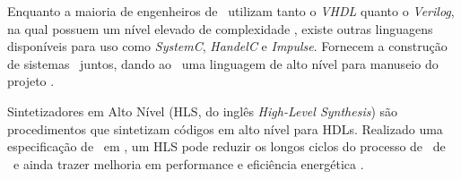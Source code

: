 


		Enquanto a maioria de engenheiros de \hardware\ utilizam tanto o \textit{VHDL} quanto o \textit{Verilog}, na qual possuem um nível elevado de complexidade \cite{Choi2016}, existe outras linguagens disponíveis para uso como \textit{SystemC}, \textit{HandelC} e \textit{Impulse}. Fornecem a construção de sistemas \hs\ juntos, dando ao \designer\ uma linguagem de alto nível para manuseio do projeto \cite{Sass2010}.


		Sintetizadores em Alto Nível (HLS, do inglês \textit{High-Level Synthesis}) são procedimentos que sintetizam códigos em alto nível para HDLs. Realizado uma especificação de \design\ em \software, um HLS pode reduzir os longos ciclos do processo de \design\ de \hardware\ e ainda trazer melhoria em performance e eficiência energética \cite{Choi2016}.

